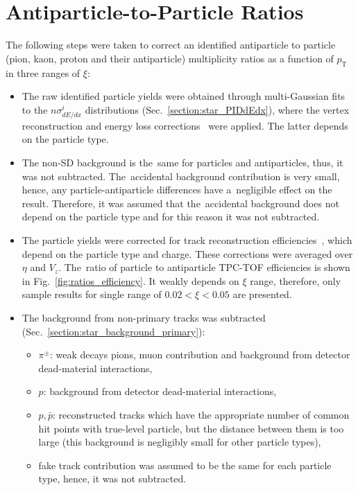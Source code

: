 \section{Antiparticle-to-Particle Ratios}\label{section:star_ratios}
The following steps were taken to correct an  identified antiparticle to particle (pion, kaon, proton and their antiparticle) multiplicity ratios as a function of $p_\textrm{T}$ in three ranges of $\xi$:
\begin{itemize}
	\item The raw identified particle yields were obtained through multi-Gaussian fits to the $n\sigma^i_{dE/dx}$ distributions (Sec.~\ref{section:star_PIDdEdx}), where the vertex reconstruction and energy loss corrections~\cite{supplementaryNote} were applied. The latter depends on the particle type.
	\item The non-SD background is the~same for particles and  antiparticles, thus, it was not subtracted.
	The~accidental background contribution is very small, hence, any particle-antiparticle differences have a~negligible effect on the result. Therefore, 
	 it was assumed that the~accidental background does not depend on the particle type and for this reason it was not subtracted. 
	\item The particle yields were corrected for track reconstruction efficiencies~\cite{supplementaryNote}, which depend on the particle type and charge. These corrections were averaged over $\eta$ and $V_{z}$.
	The~ratio of particle to antiparticle TPC-TOF efficiencies is shown in Fig.~\ref{fig:ratios_efficiency}.  It weakly depends on $\xi$ range, therefore, only sample results for single range of $0.02<\xi<0.05$  are presented.
	\item The background from non-primary tracks was subtracted (Sec.~\ref{section:star_background_primary}):
	\begin{itemize}
		\item $\pi^\pm$: weak decays pions, muon contribution and background from  detector dead-material interactions,
		\item $p$: background from  detector dead-material interactions,
		\item $p,\bar{p}$: reconstructed tracks which have the appropriate number of common hit points with true-level particle, but the distance between them is too large (this background is negligibly small for other particle types),
		\item fake track contribution was assumed to be the same for each particle type, hence, it was not subtracted. 

\end{itemize}
\end{itemize}

